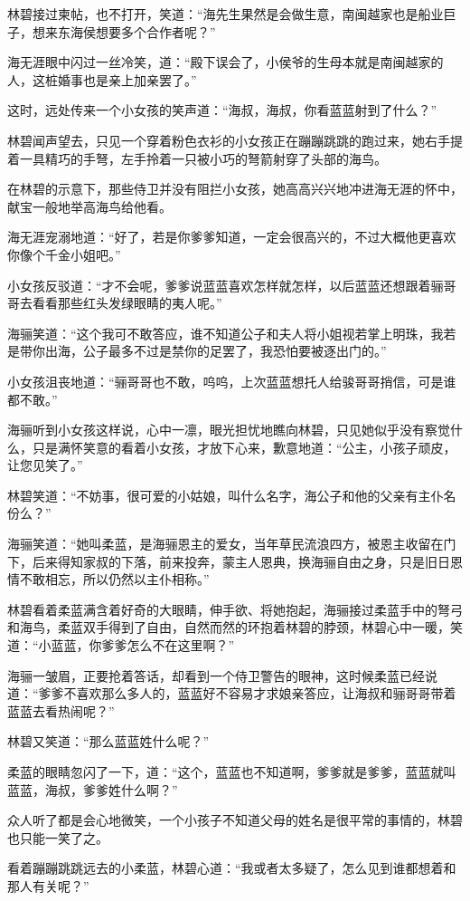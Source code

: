 林碧接过柬帖，也不打开，笑道：“海先生果然是会做生意，南闽越家也是船业巨子，想来东海侯想要多个合作者呢？”

海无涯眼中闪过一丝冷笑，道：“殿下误会了，小侯爷的生母本就是南闽越家的人，这桩婚事也是亲上加亲罢了。”

这时，远处传来一个小女孩的笑声道：“海叔，海叔，你看蓝蓝射到了什么？”

林碧闻声望去，只见一个穿着粉色衣衫的小女孩正在蹦蹦跳跳的跑过来，她右手提着一具精巧的手弩，左手拎着一只被小巧的弩箭射穿了头部的海鸟。

在林碧的示意下，那些侍卫并没有阻拦小女孩，她高高兴兴地冲进海无涯的怀中，献宝一般地举高海鸟给他看。

海无涯宠溺地道：“好了，若是你爹爹知道，一定会很高兴的，不过大概他更喜欢你像个千金小姐吧。”

小女孩反驳道：“才不会呢，爹爹说蓝蓝喜欢怎样就怎样，以后蓝蓝还想跟着骊哥哥去看看那些红头发绿眼睛的夷人呢。”

海骊笑道：“这个我可不敢答应，谁不知道公子和夫人将小姐视若掌上明珠，我若是带你出海，公子最多不过是禁你的足罢了，我恐怕要被逐出门的。”

小女孩沮丧地道：“骊哥哥也不敢，呜呜，上次蓝蓝想托人给骏哥哥捎信，可是谁都不敢。”

海骊听到小女孩这样说，心中一凛，眼光担忧地瞧向林碧，只见她似乎没有察觉什么，只是满怀笑意的看着小女孩，才放下心来，歉意地道：“公主，小孩子顽皮，让您见笑了。”

林碧笑道：“不妨事，很可爱的小姑娘，叫什么名字，海公子和他的父亲有主仆名份么？”

海骊笑道：“她叫柔蓝，是海骊恩主的爱女，当年草民流浪四方，被恩主收留在门下，后来得知家叔的下落，前来投奔，蒙主人恩典，换海骊自由之身，只是旧日恩情不敢相忘，所以仍然以主仆相称。”

林碧看着柔蓝满含着好奇的大眼睛，伸手欲、将她抱起，海骊接过柔蓝手中的弩弓和海鸟，柔蓝双手得到了自由，自然而然的环抱着林碧的脖颈，林碧心中一暖，笑道：“小蓝蓝，你爹爹怎么不在这里啊？”

海骊一皱眉，正要抢着答话，却看到一个侍卫警告的眼神，这时候柔蓝已经说道：“爹爹不喜欢那么多人的，蓝蓝好不容易才求娘亲答应，让海叔和骊哥哥带着蓝蓝去看热闹呢？”

林碧又笑道：“那么蓝蓝姓什么呢？”

柔蓝的眼睛忽闪了一下，道：“这个，蓝蓝也不知道啊，爹爹就是爹爹，蓝蓝就叫蓝蓝，海叔，爹爹姓什么啊？”

众人听了都是会心地微笑，一个小孩子不知道父母的姓名是很平常的事情的，林碧也只能一笑了之。

看着蹦蹦跳跳远去的小柔蓝，林碧心道：“我或者太多疑了，怎么见到谁都想着和那人有关呢？”

